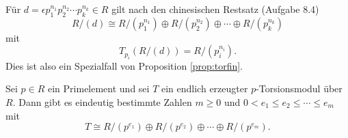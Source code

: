 \documentclass{book}
\begin{document}
\begin{exa}
    \label{exa:chinese}
    Für $d = \epsilon p_1^{n_1} p_2^{n_2} \cdots p_k^{n_k} \in R$ gilt nach den chinesischen Restsatz (Aufgabe 8.4) 
    \[
        R/(d) \cong R/(p_1^{n_1}) \oplus  R/(p_2^{n_2}) \oplus \cdots \oplus R/(p_k^{n_k})
    \]
    mit
    \[
        T_{p_i}(R/(d)) = R/(p_i^{n_i}).
    \]
    Dies ist also ein Spezialfall von Proposition \ref{prop:torfin}.
\end{exa}


\begin{thm}
    \label{thm:fghir}
    Sei $p \in R$ ein Primelement und sei $T$ ein endlich erzeugter
    $p$-Torsionsmodul über $R$. Dann gibt es eindeutig bestimmte Zahlen $m \ge 0$ und
    $0 < e_1 \le e_2 \le \cdots \le e_m$ mit
        \begin{equation}
            \label{eq:classification}
            T \cong R/(p^{e_1}) \oplus R/(p^{e_2}) \oplus \cdots \oplus R/(p^{e_m}).
        \end{equation}
\end{thm}
\end{document}
